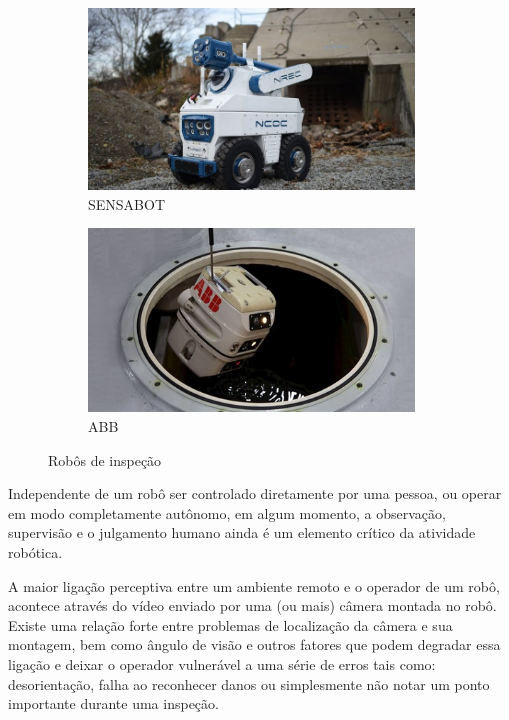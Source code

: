 \begin{figure}[H]
	\centering
	\begin{subfigure}{.5\textwidth}
		\includegraphics[width=0.95\textwidth]{figuras/sensabot.jpg}
		\caption{SENSABOT}
		\label{fig:sensabot}
	\end{subfigure}%
	\begin{subfigure}{.5\textwidth}
		\includegraphics[width=0.95\textwidth]{figuras/abb.jpg}
		\caption{ABB}
		\label{fig:abb}
	\end{subfigure}
	\caption{Robôs de inspeção}
\end{figure}

Independente de um robô ser controlado diretamente por uma pessoa, ou operar em modo completamente autônomo, em algum momento, a observação, supervisão e o julgamento humano ainda é um elemento crítico da atividade robótica.\par

A maior ligação perceptiva entre um ambiente remoto e o operador de um robô, acontece através do vídeo enviado por uma (ou mais) câmera montada no robô. Existe uma relação forte entre problemas de localização da câmera e sua montagem, bem como ângulo de visão e outros fatores que podem degradar essa ligação e deixar o operador vulnerável a uma série de erros tais como: desorientação, falha ao reconhecer danos ou simplesmente não notar um ponto importante durante uma inspeção.\par

